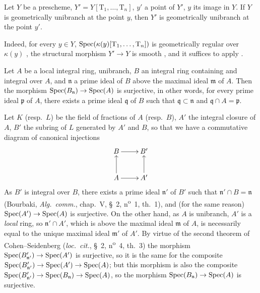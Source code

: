 \begin{lemma}[14.4.1.1]
\label{IV.14.4.1.1}
Let $Y$ be a prescheme, $Y'=Y[\mathrm{T}_1,\ldots,\mathrm{T}_n]$, $y'$ a point of $Y'$, $y$ its image in $Y$.
If $Y$ is geometrically unibranch at the point $y$, then $Y'$ is geometrically unibranch at the point $y'$.
\end{lemma}

Indeed, for every $y\in Y$, $\operatorname{Spec}(\kappa(y)[\mathrm{T}_1,\ldots,\mathrm{T}_n])$ is geometrically regular over $\kappa(y)$ , the structural morphism $Y'\to Y$ is smooth , and it suffices to apply .

\begin{lemma}[14.4.1.2]
\label{IV.14.4.1.2}
Let $A$ be a local integral ring, unibranch, $B$ an integral ring containing and integral over $A$, and $\mathfrak{n}$ a prime ideal of $B$ above the maximal ideal $\mathfrak{m}$ of $A$.
Then the morphism $\operatorname{Spec}(B_\mathfrak{n})\to\operatorname{Spec}(A)$ is surjective, in other words, for every prime ideal $\mathfrak{p}$ of $A$, there exists a prime ideal $\mathfrak{q}$ of $B$ such that $\mathfrak{q}\subset\mathfrak{n}$ and $\mathfrak{q}\cap A=\mathfrak{p}$.
\end{lemma}

Let $K$ (resp.\ $L$) be the field of fractions of $A$ (resp.\ $B$), $A'$ the integral closure of $A$, $B'$ the subring of $L$ generated by $A'$ and $B$, so that we have a commutative diagram of canonical injections
\[
  \xymatrix{
    B \ar[r] & B' \\
    A \ar[u] \ar[r] & A' \ar[u]
  }
\]
As $B'$ is integral over $B$, there exists a prime ideal $\mathfrak{n}'$ of $B'$ such that $\mathfrak{n}'\cap B=\mathfrak{n}$ (Bourbaki, \emph{Alg.\ comm.}, chap.~V, \S~2, n\textsuperscript{o}~1, th.~1), and (for the same reason) $\operatorname{Spec}(A')\to\operatorname{Spec}(A)$ is surjective.
On the other hand, as $A$ is unibranch, $A'$ is a \emph{local} ring, so $\mathfrak{n}'\cap A'$, which is above the maximal ideal $\mathfrak{m}$ of $A$, is necessarily equal to the unique maximal ideal $\mathfrak{m}'$ of $A'$.
By virtue of the second theorem of Cohen--Seidenberg (\emph{loc.\ cit.}, \S~2, n\textsuperscript{o}~4, th.~3) the morphism $\operatorname{Spec}(B'_{\mathfrak{n}'})\to\operatorname{Spec}(A')$ is surjective, so it is the same for the composite $\operatorname{Spec}(B'_{\mathfrak{n}'})\to\operatorname{Spec}(A')\to\operatorname{Spec}(A)$; but this morphism is also the composite $\operatorname{Spec}(B'_{\mathfrak{n}'})\to\operatorname{Spec}(B_\mathfrak{n})\to\operatorname{Spec}(A)$, so the morphism $\operatorname{Spec}(B_\mathfrak{n})\to\operatorname{Spec}(A)$ is surjective.

